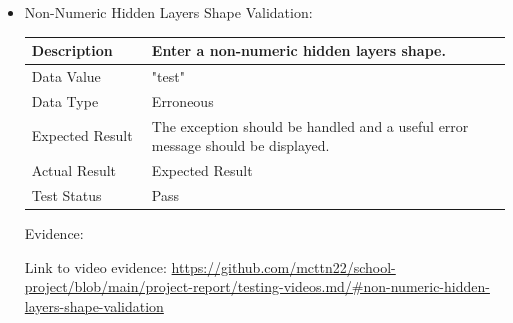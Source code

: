 \documentclass[./project-report/src/latex/project-report.tex]{subfiles}
\begin{document}
\begin{itemize}
	\item Non-Numeric Hidden Layers Shape Validation: \newline\newline
		\begin{tabular}{|p{0.25\linewidth}|p{0.75\linewidth}|}
			\hline
			Description & Enter a non-numeric hidden layers shape. \\
			\hline
			Data Value & "test" \\
			\hline
			Data Type & Erroneous \\
			\hline
			Expected Result & The exception should be handled and a useful error message should be displayed. \\
			\hline
			Actual Result & Expected Result \\
			\hline
			Test Status & Pass \\
			\hline
		\end{tabular}

		\vspace{5mm}

		Evidence:
		\begin{figure}[h!]
		\centering
		\end{figure}

		\begin{sloppypar}
		Link to video evidence: \url{https://github.com/mcttn22/school-project/blob/main/project-report/testing-videos.md/#non-numeric-hidden-layers-shape-validation}
		\end{sloppypar}

		\pagebreak


\end{itemize}
\end{document}
